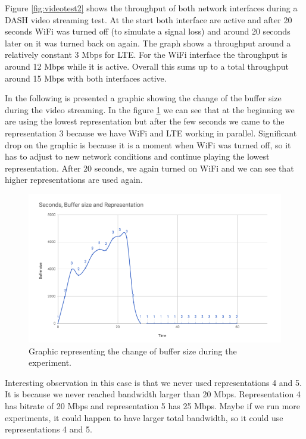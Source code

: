 \documentclass{llncs}
\begin{document}
Figure \ref{fig:videotest2} shows the throughput of both network interfaces during a DASH video streaming test. At the start both interface are active and after 20 seconds WiFi was turned off (to simulate a signal loss) and around 20 seconds later on it was turned back on again. The graph shows a throughput around a relatively constant 3 Mbps for LTE. For the WiFi interface the throughput is around 12 Mbps while it is active. Overall this sums up to a total throughput around 15 Mbps with both interfaces active.

In the following is presented a graphic showing the change of the buffer size during the video streaming. In the figure \ref{fig:buffer2} we can see that at the beginning we are using the lowest representation but after the few seconds we came to the representation 3 because we have WiFi and LTE working in parallel. Significant drop on the graphic is because it is a moment when WiFi was turned off, so it has to adjust to new network conditions and continue playing the lowest representation. After 20 seconds, we again turned on WiFi and we can see that higher representations are used again. 

 
\begin{figure}[H]
\centering
\includegraphics[width=1.0\textwidth]{buffer-test-2.png}
\caption{\label{fig:buffer2} Graphic representing the change of buffer size during the experiment.}
\end{figure}

Interesting observation in this case is that we never used representations 4 and 5. It is because we never reached bandwidth larger than 20 Mbps. Representation 4 has bitrate of 20 Mbps and representation 5 has 25 Mbps. Maybe if we run more experiments, it could happen to have larger total bandwidth, so it could use representations 4 and 5.
\end{document}
